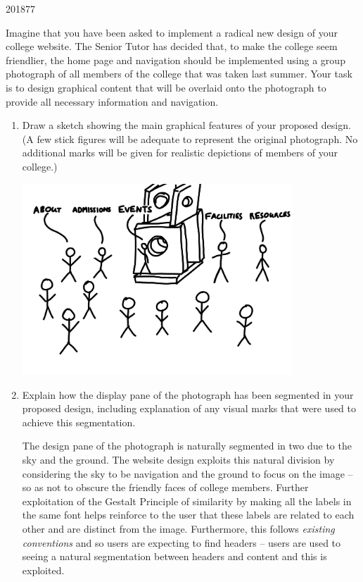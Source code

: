 \documentclass[10pt,\jkfside,a4paper]{article}
\begin{document}
\begin{examquestion}{2018}{7}{7}

Imagine that you have been asked to implement a radical new design of your
college website. The Senior Tutor has decided that, to make the college seem
friendlier, the home page and navigation should be implemented using a group
photograph of all members of the college that was taken last summer. Your
task is to design graphical content that will be overlaid onto the
photograph to provide all necessary information and navigation.

\begin{enumerate}

\item Draw a sketch showing the main graphical features of your proposed
design. (A few stick figures will be adequate to represent the original
photograph. No additional marks will be given for realistic depictions of
members of your college.)

\begin{center}
\includegraphics[width=0.8\textwidth]{website_jpg}
\end{center}

\item Explain how the display pane of the photograph has been segmented in
your proposed design, including explanation of any visual marks that were
used to achieve this segmentation.

The design pane of the photograph is naturally segmented in two due to the
sky and the ground. The website design exploits this natural division by
considering the sky to be navigation and the ground to focus on the image --
so as not to obscure the friendly faces of college members. Further
exploitation of the Gestalt Principle of similarity by making all the labels
in the same font helps reinforce to the user that these labels are related
to each other and are distinct from the image. Furthermore, this follows
\textit{existing conventions} and so users are expecting to find headers --
users are used to seeing a natural segmentation between headers and content
and this is exploited.


\end{enumerate}
\end{examquestion}
\end{document}
